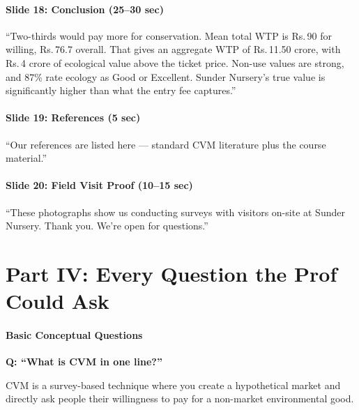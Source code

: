 \documentclass[11pt, a4paper]{article}
\newcommand{\rupee}{Rs.\,}
\newenvironment{ansbox}{%
    \def\FrameCommand{\textcolor{darkgreen}{\vrule width 2pt}\hspace{8pt}}%
    \MakeFramed{\advance\hsize-\width\FrameRestore}%
}{%
    \endMakeFramed%
}
\begin{document}
\subsection{Slide 18: Conclusion \normalfont\small(25--30 sec)}
\begin{ansbox}
``Two-thirds would pay more for conservation. Mean total WTP is \rupee 90 for willing, \rupee 76.7 overall. That gives an aggregate WTP of \rupee 11.50 crore, with \rupee 4 crore of ecological value above the ticket price. Non-use values are strong, and 87\% rate ecology as Good or Excellent. Sunder Nursery's true value is significantly higher than what the entry fee captures.''
\end{ansbox}

\subsection{Slide 19: References \normalfont\small(5 sec)}
\begin{ansbox}
``Our references are listed here --- standard CVM literature plus the course material.''
\end{ansbox}

\subsection{Slide 20: Field Visit Proof \normalfont\small(10--15 sec)}
\begin{ansbox}
``These photographs show us conducting surveys with visitors on-site at Sunder Nursery. Thank you. We're open for questions.''
\end{ansbox}

\newpage
\part*{Part IV: Every Question the Prof Could Ask}

\subsection{Basic Conceptual Questions}

\textbf{Q: ``What is CVM in one line?''}
\begin{ansbox}
CVM is a survey-based technique where you create a hypothetical market and directly ask people their willingness to pay for a non-market environmental good.
\end{ansbox}
\end{document}
